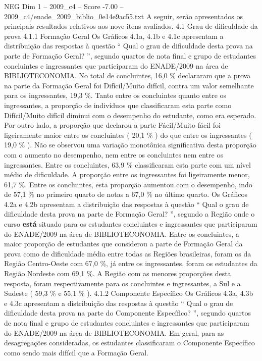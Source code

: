 \begin{textsample}{NEG Dim 1 – 2009\_c4 – Score -7.00 – 2009\_c4/enade\_2009\_biblio\_0e14e9ac55.txt}
A seguir, serão apresentados os principais resultados relativos aos nove itens avaliados. 4.1 Grau de dificuldade da prova 4.1.1 Formação Geral Os Gráficos 4.1a, 4.1b e 4.1c apresentam a distribuição das respostas à questão “ Qual o grau de dificuldade desta prova na parte de Formação Geral? ”, segundo quartos de nota final e grupo de estudantes concluintes e ingressantes que participaram do ENADE/2009 na área de BIBLIOTECONOMIA.
No total de concluintes, 16,0 \% declararam que a prova na parte da Formação Geral foi Difícil/Muito difícil, contra um valor semelhante para os ingressantes, 19,3 \%.
Tanto entre os concluintes quanto entre os ingressantes, a proporção de indivíduos que classificaram esta parte como Difícil/Muito difícil diminui com o desempenho do estudante, como era esperado.
Por outro lado, a proporção que declarou a parte Fácil/Muito fácil foi ligeiramente maior entre os concluintes ( 20,1 \% ) do que entre os ingressantes ( 19,0 \% ).
Não se observou uma variação monotônica significativa desta proporção com o aumento no desempenho, nem entre os concluintes nem entre os ingressantes.
Entre os concluintes, 63,9 \% classificaram esta parte com um nível médio de dificuldade.
A proporção entre os ingressantes foi ligeiramente menor, 61,7 \%.
Entre os concluintes, esta proporção aumentou com o desempenho, indo de 57,1 \% no primeiro quarto de notas a 67,0 \% no último quarto.
Os Gráficos 4.2a e 4.2b apresentam a distribuição das respostas à questão “ Qual o grau de dificuldade desta prova na parte de Formação Geral? ”, segundo a Região onde o curso \textbf{está} situado para os estudantes concluintes e ingressantes que participaram do ENADE/2009 na área de BIBLIOTECONOMIA.
Entre os concluintes, a maior proporção de estudantes que considerou a parte de Formação Geral da prova como de dificuldade média entre todas as Regiões brasileiras, foram os da Região Centro-Oeste com 67,0 \%, já entre os ingressantes, foram os estudantes da Região Nordeste com 69,1 \%.
A Região com as menores proporções desta resposta, foram respectivamente para os concluintes e ingressantes, a Sul e a Sudeste ( 59,3 \% e 55,1 \% ). 4.1.2 Componente Específico Os Gráficos 4.3a, 4.3b e 4.3c apresentam a distribuição das respostas à questão “ Qual o grau de dificuldade desta prova na parte do Componente Específico? ”, segundo quartos de nota final e grupo de estudantes concluintes e ingressantes que participaram do ENADE/2009 na área de BIBLIOTECONOMIA.
Em geral, para as desagregações consideradas, os estudantes classificaram o Componente Específico como sendo mais difícil que a Formação Geral.

\end{textsample}
